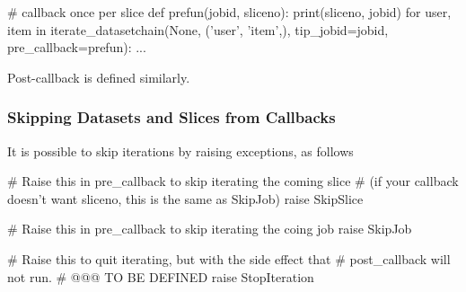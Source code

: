 \begin{python}
# callback once per slice
def prefun(jobid, sliceno):
    print(sliceno, jobid)
for user, item in iterate_datasetchain(None, ('user', 'item',), tip_jobid=jobid,
                                       pre_callback=prefun):
    ...
\end{python}
Post-callback is defined similarly.



\subsubsection*{Skipping Datasets and Slices from Callbacks}
It is possible to skip iterations by raising exceptions, as follows
\begin{python}

# Raise this in pre_callback to skip iterating the coming slice
# (if your callback doesn't want sliceno, this is the same as SkipJob)
raise SkipSlice

# Raise this in pre_callback to skip iterating the coing job
raise SkipJob

# Raise this to quit iterating, but with the side effect that
# post_callback will not run.
# @@@ TO BE DEFINED
raise StopIteration
\end{python}
